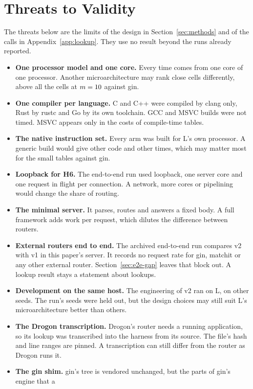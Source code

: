 \section{Threats to Validity}\label{sec:threats}

The threats below are the limits of the design in Section~\ref{sec:methods} and of the calls in
Appendix~\ref{app:lookup}. They use no result beyond the runs already reported.

\begin{itemize}
\item \textbf{One processor model and one core.} Every time comes from one core of one \HostLArch{}
processor. Another microarchitecture may rank close cells differently, above all the cells at
$m=10$ against gin.
\item \textbf{One compiler per language.} C and C++ were compiled by clang only, Rust by rustc and Go by
its own toolchain. GCC and MSVC builds were not timed. MSVC appears only in the costs of compile-time
tables.
\item \textbf{The native instruction set.} Every arm was built for L's own processor. A generic build
would give other code and other times, which may matter most for the small tables against gin.
\item \textbf{Loopback for H6.} The end-to-end run used loopback, one server core and one request in
flight per connection. A network, more cores or pipelining would change the share of routing.
\item \textbf{The minimal server.} It parses, routes and answers a fixed body. A full framework adds
work per request, which dilutes the difference between routers.
\item \textbf{External routers end to end.} The archived end-to-end run compares v2 with v1 in this
paper's server. It records no request rate for gin, matchit or any other external router.
Section~\ref{sec:e2e-gap} leaves that block out. A lookup result stays a statement about lookups.
\item \textbf{Development on the same host.} The engineering of v2 ran on L, on other seeds. The run's
seeds were held out, but the design choices may still suit L's microarchitecture better than others.
\item \textbf{The Drogon transcription.} Drogon's router needs a running application, so its lookup was
transcribed into the harness from its source. The file's hash and line ranges are pinned. A
transcription can still differ from the router as Drogon runs it.
\item \textbf{The gin shim.} gin's tree is vendored unchanged, but the parts of gin's engine that a

\end{itemize}
